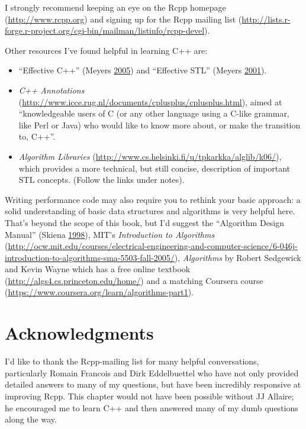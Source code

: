 \documentclass[]{book}
\renewcommand{\href}[2]{#2 (\url{#1})}
\begin{document}
I strongly recommend keeping an eye on the \href{http://www.rcpp.org}{Rcpp homepage} and signing up for the \href{http://lists.r-forge.r-project.org/cgi-bin/mailman/listinfo/rcpp-devel}{Rcpp mailing list}.

Other resources I've found helpful in learning C++ are:

\begin{itemize}
\item
  ``Effective C++'' (Meyers \protect\hyperlink{ref-effective-cpp}{2005}) and ``Effective STL'' (Meyers \protect\hyperlink{ref-effective-stl}{2001}).
\item
  \href{http://www.icce.rug.nl/documents/cplusplus/cplusplus.html}{\emph{C++ Annotations}},
  aimed at ``knowledgeable users of C (or any other language using a C-like
  grammar, like Perl or Java) who would like to know more about, or make the
  transition to, C++''.
\item
  \href{http://www.cs.helsinki.fi/u/tpkarkka/alglib/k06/}{\emph{Algorithm Libraries}},
  which provides a more technical, but still concise, description of
  important STL concepts. (Follow the links under notes).
\end{itemize}

Writing performance code may also require you to rethink your basic approach: a solid understanding of basic data structures and algorithms is very helpful here. That's beyond the scope of this book, but I'd suggest the ``Algorithm Design Manual'' (Skiena \protect\hyperlink{ref-alg-design-man}{1998}), MIT's \href{http://ocw.mit.edu/courses/electrical-engineering-and-computer-science/6-046j-introduction-to-algorithms-sma-5503-fall-2005/}{\emph{Introduction to Algorithms}}, \emph{Algorithms} by Robert Sedgewick and Kevin Wayne which has a free \href{http://algs4.cs.princeton.edu/home/}{online textbook} and a matching \href{https://www.coursera.org/learn/algorithms-part1}{Coursera course}.

\hypertarget{acknowledgments}{%
\section{Acknowledgments}\label{acknowledgments}}

I'd like to thank the Rcpp-mailing list for many helpful conversations, particularly Romain Francois and Dirk Eddelbuettel who have not only provided detailed answers to many of my questions, but have been incredibly responsive at improving Rcpp. This chapter would not have been possible without JJ Allaire; he encouraged me to learn C++ and then answered many of my dumb questions along the way.
\end{document}
